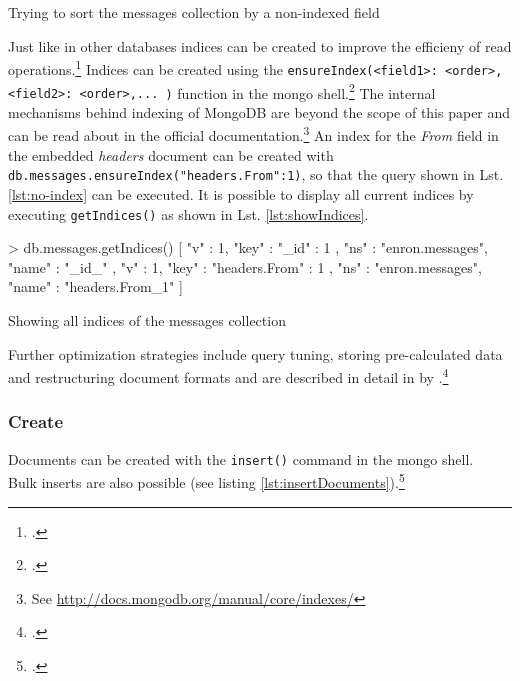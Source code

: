 \begin{listing}
    \caption{Trying to sort the messages collection by a non-indexed field}
    \label{lst:no-index}
\end{listing}

Just like in other databases indices can be created to improve the efficieny of
read operations.\footcite[Cf.][152 et sq.]{Redmond_2012} Indices can be created
using the \texttt{ensureIndex({<field1>: <order>, <field2>: <order>,... })}
function in the mongo shell.\footcite[Cf.][12]{mongo_crud_manual} 
The internal mechanisms behind indexing of MongoDB are beyond the scope of this
paper and can be read about in the official documentation.\footnote{See
\url{http://docs.mongodb.org/manual/core/indexes/}} An index for the
\textit{From} field in the embedded \textit{headers} document can be created
with \texttt{db.messages.ensureIndex({"headers.From":1})}, so that the query
shown in Lst. \ref{lst:no-index} can be executed. It is possible to display all
current indices by executing \texttt{getIndices()} as shown in Lst.
\ref{lst:showIndices}.

\begin{listing}
    \begin{javascriptcode}
> db.messages.getIndices()
[   {
        "v" : 1,
        "key" : { "_id" : 1 },
        "ns" : "enron.messages",
        "name" : "_id_"
    },
    {
        "v" : 1,
        "key" : { "headers.From" : 1 },
        "ns" : "enron.messages",
        "name" : "headers.From_1"
    } ]
    \end{javascriptcode}
    \caption{Showing all indices of the messages collection}
    \label{lst:showIndices}
\end{listing}

Further optimization strategies include query tuning, storing pre-calculated
data and restructuring document formats and are described in detail in
 by
\citeauthor{Chodorow_2011_tips}.\footcite[Cf.][]{Chodorow_2011_tips}

\FloatBarrier
\subsubsection{Create}
Documents can be created with the \texttt{insert()} command in the mongo
shell.\\
Bulk inserts are also possible (see listing \ref{lst:insertDocuments}).\footcite[Cf.][p. 53 et sqq.]{mongo_crud_manual}

